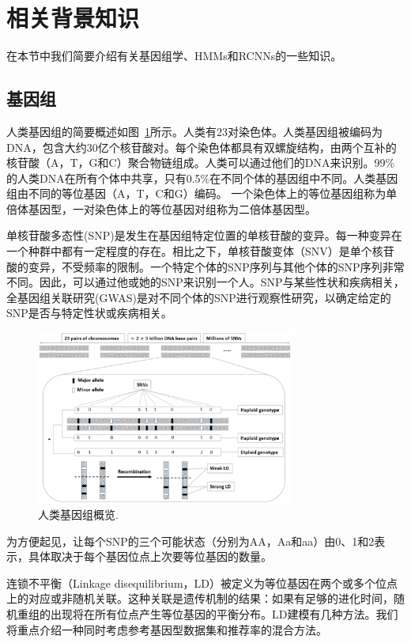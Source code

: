 \section{相关背景知识}\label{sec:back}

在本节中我们简要介绍有关基因组学、HMMs和RCNNs的一些知识。

\subsection{基因组}
人类基因组的简要概述如图~\ref{fig:human-genomic-overview}所示\cite{samani2015quantifying}。人类有23对染色体。人类基因组被编码为DNA，包含大约30亿个核苷酸对。每个染色体都具有双螺旋结构，由两个互补的核苷酸（A，T，G和C）聚合物链组成。人类可以通过他们的DNA来识别。99\%的人类DNA在所有个体中共享，只有0.5\%在不同个体的基因组中不同。人类基因组由不同的等位基因（A，T，C和G）编码。 一个染色体上的等位基因组称为单倍体基因型，一对染色体上的等位基因对组称为二倍体基因型\cite{durbin1998biological}。

单核苷酸多态性(SNP)是发生在基因组特定位置的单核苷酸的变异。每一种变异在一个种群中都有一定程度的存在。相比之下，单核苷酸变体（SNV）是单个核苷酸的变异，不受频率的限制。一个特定个体的SNP序列与其他个体的SNP序列非常不同。因此，可以通过他或她的SNP来识别一个人。SNP与某些性状和疾病相关，全基因组关联研究(GWAS)是对不同个体的SNP进行观察性研究，以确定给定的SNP是否与特定性状或疾病相关。
\begin{figure}
	\centering
	\includegraphics[width = 8.5cm]{./figures/Fig1-human-genomic-overview.eps}
	\caption{人类基因组概览\cite{samani2015quantifying}.
	}
	\label{fig:human-genomic-overview}
\end{figure}

为方便起见，让每个SNP的三个可能状态（分别为AA，Aa和aa）由0、1和2表示，具体取决于每个基因位点上次要等位基因的数量。

连锁不平衡（Linkage disequilibrium，LD）被定义为等位基因在两个或多个位点上的对应或非随机关联。这种关联是遗传机制的结果：如果有足够的进化时间，随机重组的出现将在所有位点产生等位基因的平衡分布。LD建模有几种方法。我们将重点介绍一种同时考虑参考基因型数据集和推荐率的混合方法。

